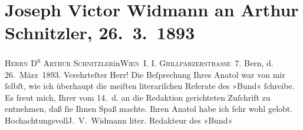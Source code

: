 

         \renewcommand{\erwaehnteInstitutionen}{Institutionen: Der Bund}
         \renewcommand{\erwaehnteOrte}{Orte: Bern, Grillparzerstraße, I., Innere Stadt, Wien}
         \renewcommand{\erwaehnteWerke}{Werke: Anatol, Kunst und Litteratur}
               \section[Joseph Victor Widmann an Arthur Schnitzler, 26. 3. 1893]{ Joseph Victor Widmann an Arthur Schnitzler,
                    26. 3. 1893}\nopagebreak{}\rehead{ }\begin{ledgroupsized}[t]{13cm}\normalsize\beginnumbering \toendnotes[C]{\smallbreak\pagebreak[2]} 
\toendnotes[C]{\smallbreak}\pstart{}{\pb}\textsc{Herrn
                                D\textsuperscript{r} Arthur Schnitzler}\pend{}\pstart{}in\pend{}\pstart{}\textsc{Wien} I. \pend{}\pstart{}\textsc{I.
                                Grillparzerstraſse 7.}\pend{}{\bigskip}\pstart
           \raggedleft{}{\pb}Bern, d.
                            26. März 1893.\pend
           \pstart{}Verehrteſter Herr!\pend\pstart
           Die Beſprechung Ihres Anatol war von mir ſelbſt, wie ich überhaupt die meiſten
                    literariſchen Referate des »Bund« ſchreibe. Es
                    freut mich, Ihrer vom 14. d. an die Redaktion gerichteten Zuſchrift zu
                    entnehmen, daß ſie Ihnen Spaß machte.  Ihren
                        Anatol habe ich ſehr wohl gelobt.\pend
           \pstart Hochachtungsvoll\spacefill\mbox{J. V. Widmann}\pend{}\pstart
           \raggedleft{}liter. Redakteur des »Bund«\pend
           
         
         \endnumbering{}\end{ledgroupsized}  \newcommand{\dateiname}{L00193}\newcommand{\titel}{Joseph Victor Widmann an Arthur Schnitzler, 26. 3. 1893}\newcommand{\editorInnen}{Martin Anton Müller und Gerd-Hermann Susen}
      